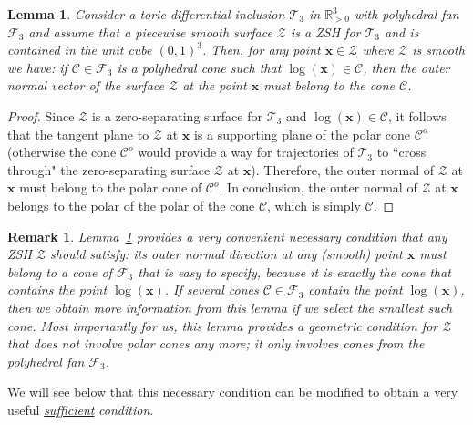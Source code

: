 \documentclass[12pt,letterpaper]{article}
\newtheorem{lem}[thm]{Lemma}
\newtheorem{rem}[thm]{Remark}
\newcommand{\C}{\mathcal{C}}
\newcommand{\T}{\mathcal{T}}
\newcommand{\F}{\mathcal{F}}
\newcommand{\Z}{\mathcal{Z}}
\newcommand{\x}{\mathbf{x}}
\newcommand{\RR}{\mathbb{R}}
\begin{document}
\begin{lem}
\label{lemma_outer_normal_necessary}
%
Consider a toric differential inclusion $\T_3$ in $\RR^3_{>0}$ with polyhedral fan $\F_3$ and assume that a piecewise smooth surface $\Z$ is a ZSH for $\T_3$ and is contained in the unit cube $(0,1)^3$. 
Then, for any point $\x \in \Z$ where $\Z$ is smooth we have: if $\C \in \F_3$ is a polyhedral cone such that $\log(\x) \in \C$, then the outer normal vector of the surface $\Z$ at the point $\x$ must belong to the cone $\C$. 
%
\end{lem}

\begin{proof}
Since $\Z$ is a zero-separating surface for $\T_3$ and $\log(\x) \in \C$, it follows that the tangent plane to $\Z$ at $\x$ is a supporting plane of the polar cone $\C^o$ (otherwise the cone $\C^o$ would provide a way for trajectories of $\T_3$ to ``cross through" the zero-separating surface $\Z$ at $\x$). Therefore, the outer normal of $\Z$ at $\x$ must belong to the polar cone of $\C^o$.  In conclusion, the outer normal of $\Z$ at $\x$ belongs to the polar of the polar of the cone $\C$, which is simply $\C$.
\end{proof}

\begin{rem}
\label{remark_outer_normal}
Lemma~\ref{lemma_outer_normal_necessary} provides a very convenient necessary condition that any ZSH $\Z$ should satisfy: its outer normal direction at any (smooth) point $\x$ must belong to a cone of $\F_3$ that is easy to specify, because it is exactly the cone that contains the point $\log(\x)$. If several cones $\C \in \F_3$ contain the point $\log(\x)$, then we obtain more information from this lemma if we select the smallest such cone. Most importantly for us, this lemma provides a geometric condition for $\Z$ that does not involve  polar cones any more; it only involves cones from the polyhedral fan $\F_3$.  
\end{rem}

We will see below that this necessary condition can be modified  to obtain a very useful  \underline{\em sufficient} {\em condition}. 
\end{document}
